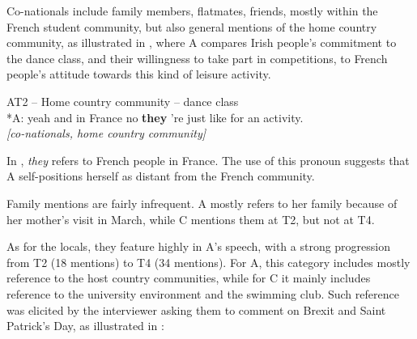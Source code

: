 \documentclass[output=paper]{langscibook}
\begin{document}
Co-nationals include family members, flatmates, friends, mostly within the French student community, but also general mentions of the home country community, as illustrated in , where A compares Irish people’s commitment to the dance class, and their willingness to take part in competitions, to French people’s attitude towards this kind of leisure activity.

\ea%
    \label{ex:12}
    AT2 – Home country community – dance class\medskip\\
*A: \tab yeah and in France no \textbf{they} ’re just like for an activity.  \\ \tab \textit{[co-nationals, home country community]}\\
\z

In , \textit{they} refers to French people in France. The use of this pronoun suggests that A self-positions herself as distant from the French community.

Family mentions are fairly infrequent. A mostly refers to her family because of her mother’s visit in March, while C mentions them at T2, but not at T4.

As for the locals, they feature highly in A’s speech, with a strong progression from T2 (18 mentions) to T4 (34 mentions). For A, this category includes mostly reference to the host country communities, while for C it mainly includes reference to the university environment and the swimming club. Such reference was elicited by the interviewer asking them to comment on Brexit and Saint Patrick’s Day, as illustrated in :
\end{document}

